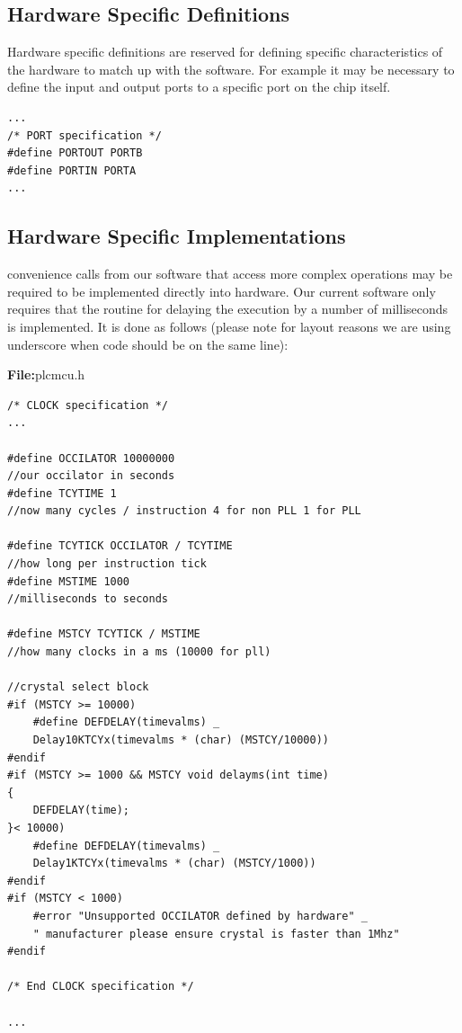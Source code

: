 \subsection{Hardware Specific Definitions}

Hardware specific definitions are reserved for defining specific characteristics of the hardware to match up with the software. For example it may be necessary to define the input and output ports to a specific port on the chip itself.



\begin{lstlisting}[frame=single]
...
/* PORT specification */
#define PORTOUT PORTB
#define PORTIN PORTA
...
\end{lstlisting}



\subsection{Hardware Specific Implementations}

convenience calls from our software that access more complex operations may be required to be implemented directly into hardware. Our current software only requires that the routine for delaying the execution by a number of milliseconds is implemented. It is done as follows (please note for layout reasons we are using underscore when code should be on the same line):

\textbf{File:}plcmcu.h



\begin{lstlisting}[frame=single]
/* CLOCK specification */
...

#define OCCILATOR 10000000 
//our occilator in seconds
#define TCYTIME 1 
//now many cycles / instruction 4 for non PLL 1 for PLL 

#define TCYTICK OCCILATOR / TCYTIME 
//how long per instruction tick
#define MSTIME 1000 
//milliseconds to seconds

#define MSTCY TCYTICK / MSTIME 
//how many clocks in a ms (10000 for pll)

//crystal select block
#if (MSTCY >= 10000)
	#define DEFDELAY(timevalms) _
	Delay10KTCYx(timevalms * (char) (MSTCY/10000))
#endif
#if (MSTCY >= 1000 && MSTCY void delayms(int time)
{
	DEFDELAY(time);
}< 10000)
	#define DEFDELAY(timevalms) _ 
	Delay1KTCYx(timevalms * (char) (MSTCY/1000))
#endif
#if (MSTCY < 1000)
	#error "Unsupported OCCILATOR defined by hardware" _ 
	" manufacturer please ensure crystal is faster than 1Mhz"
#endif

/* End CLOCK specification */

...
\end{lstlisting}



